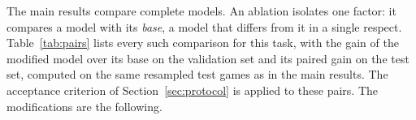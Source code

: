 \ifpairs
The main results compare complete models. An ablation isolates one factor: it
compares a model with its \emph{base}, a model that differs from it in a
single respect. Table~\ref{tab:pairs} lists every such comparison for this
task, with the gain of the modified model over its base on the validation set
and its paired gain on the test set, computed on the same resampled test
games as in the main results. The acceptance criterion of
Section~\ref{sec:protocol} is applied to these pairs. The modifications are
the following.

